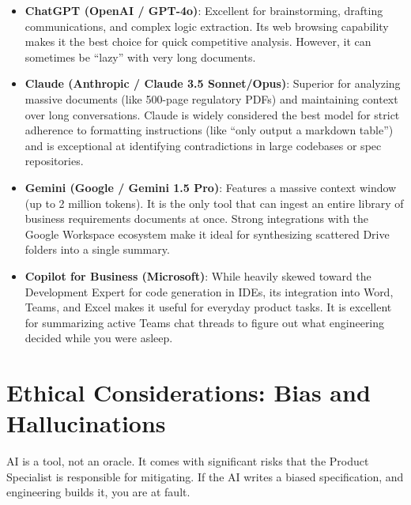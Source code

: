 \begin{itemize}
\tightlist
\item
  \textbf{ChatGPT (OpenAI / GPT-4o)}: Excellent for brainstorming,
  drafting communications, and complex logic extraction. Its web
  browsing capability makes it the best choice for quick competitive
  analysis. However, it can sometimes be ``lazy'' with very long
  documents.
\item
  \textbf{Claude (Anthropic / Claude 3.5 Sonnet/Opus)}: Superior for
  analyzing massive documents (like 500-page regulatory PDFs) and
  maintaining context over long conversations. Claude is widely
  considered the best model for strict adherence to formatting
  instructions (like ``only output a markdown table'') and is
  exceptional at identifying contradictions in large codebases or spec
  repositories.
\item
  \textbf{Gemini (Google / Gemini 1.5 Pro)}: Features a massive context
  window (up to 2 million tokens). It is the only tool that can ingest
  an entire library of business requirements documents at once. Strong
  integrations with the Google Workspace ecosystem make it ideal for
  synthesizing scattered Drive folders into a single summary.
\item
  \textbf{Copilot for Business (Microsoft)}: While heavily skewed toward
  the Development Expert for code generation in IDEs, its integration
  into Word, Teams, and Excel makes it useful for everyday product
  tasks. It is excellent for summarizing active Teams chat threads to
  figure out what engineering decided while you were asleep.
\end{itemize}

\section{Ethical Considerations: Bias and
Hallucinations}\label{ethical-considerations-bias-and-hallucinations}

AI is a tool, not an oracle. It comes with significant risks that the
Product Specialist is responsible for mitigating. If the AI writes a
biased specification, and engineering builds it, you are at fault.

